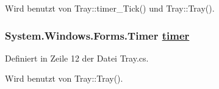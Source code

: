 Wird benutzt von Tray::timer\_\-Tick() und Tray::Tray().\hypertarget{classQbeTray_1_1Tray_QbeTray_1_1Trayr1}{
\subsubsection[timer]{\setlength{\rightskip}{0pt plus 5cm}System.Windows.Forms.Timer \hyperlink{classQbeTray_1_1Tray_QbeTray_1_1Trayr1}{timer}}}
\label{classQbeTray_1_1Tray_QbeTray_1_1Trayr1}




Definiert in Zeile 12 der Datei Tray.cs.

Wird benutzt von Tray::Tray().